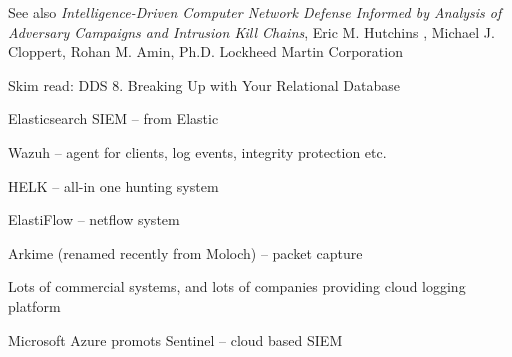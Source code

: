 \documentclass[Screen16to9,17pt]{foils}
\begin{document}


\begin{list2}
\item See also \emph{Intelligence-Driven Computer Network Defense Informed by Analysis of Adversary Campaigns and Intrusion Kill Chains}, Eric M. Hutchins , Michael J. Cloppert, Rohan M. Amin, Ph.D. Lockheed Martin Corporation\\{\footnotesize
 }
\end{list2}




\begin{quote}

\end{quote}

\begin{list1}
\item Skim read: DDS 8. Breaking Up with Your Relational Database
\begin{list2}
\item
\end{list2}
\end{list1}




\begin{quote}

\end{quote}

\begin{list2}
\item Elasticsearch SIEM -- from Elastic
\item Wazuh -- agent for clients, log events, integrity protection etc.
\item HELK -- all-in one hunting system
\item ElastiFlow -- netflow system
\item Arkime (renamed recently from Moloch) -- packet capture
\end{list2}

Lots of commercial systems, and lots of companies providing cloud logging platform

Microsoft Azure promots Sentinel -- cloud based SIEM\\ {\footnotesize
{}}
\end{document}
